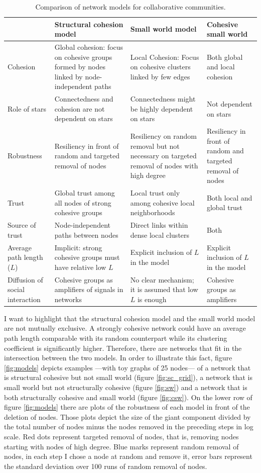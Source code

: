 \begin{table}[h]
\begin{tabular}{|p{2.2cm}|p{4.4cm}|p{4cm}|p{3.9cm}|}
\hline
&Structural cohesion model&Small world model& Cohesive small world\\
\hline
Cohesion&Global cohesion: focus on cohesive groups formed by nodes linked by node-independent paths&Local Cohesion: Focus on cohesive clusters linked by few edges&Both global and local cohesion\\
\hline
Role of stars&Connectedness and cohesion are not dependent on stars&Connectedness might be highly dependent on stars&Not dependent on stars\\
\hline
Robustness&Resiliency in front of random and targeted removal of nodes&Resiliency on random removal but not necessary on targeted removal of nodes with high degree&Resiliency in front of random and targeted removal of nodes\\
\hline
Trust&Global trust among all nodes of strong cohesive groups&Local trust only among cohesive local neighborhoods& Both local and global trust\\
\hline
Source of trust&Node-independent paths between nodes&Direct links within dense local clusters& Both\\
\hline
Average path length ($L$)&Implicit: strong cohesive groups must have relative low $L$&Explicit inclusion of $L$ in the model&Explicit inclusion of $L$ in the model\\
\hline
Diffusion of social interaction&Cohesive groups as amplifiers of signals in networks&No clear mechanism; it is assumed that low $L$ is enough&Cohesive groups as amplifiers\\
\hline
\end{tabular}
\caption{Comparison of network models for collaborative communities.}
\label{t:models}
\end{table}

I want to highlight that the structural cohesion model and the small world model are not mutually exclusive. A strongly cohesive network could have an average path length comparable with its random counterpart while its clustering coefficient is significantly higher. Therefore, there are networks that fit in the intersection between the two models. In order to illustrate this fact, figure \ref{fig:models} depicts examples ---with toy graphs of 25 nodes--- of a network that is structural cohesive but not small world (figure \ref{fig:sc_grid}), a network that is small world but not structurally cohesive (figure \ref{fig:sw}) and a network that is both structurally cohesive and small world (figure \ref{fig:csw}). On the lower row of figure \ref{fig:models} there are plots of the robustness of each model in front of the deletion of nodes. Those plots depict the size of the giant component divided by the total number of nodes minus the nodes removed in the preceding steps in log scale. Red dots represent targeted removal of nodes, that is, removing nodes starting with nodes of high degree. Blue marks represent random removal of nodes, in each step I chose a node at random and remove it, error bars represent the standard deviation over 100 runs of random removal of nodes.


